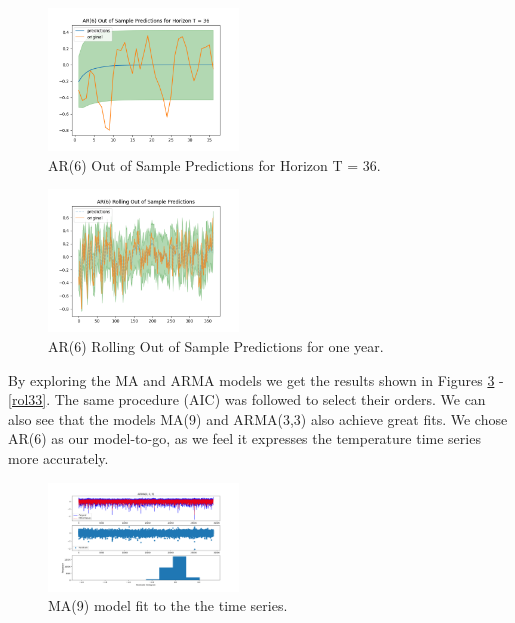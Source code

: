 \documentclass[conference]{IEEEtran}
\begin{document}
\begin{figure}[ht]
    \centering
    \includegraphics[width=0.45\textwidth]{Figures/AR(6) Out of Sample Predictions for Horizon T = 36.png}
    \caption{AR(6) Out of Sample Predictions for Horizon T = 36.}
    \label{hor6}
\end{figure}

\begin{figure}[ht]
    \centering
    \includegraphics[width=0.45\textwidth]{Figures/AR(6) Rolling Out of Sample Predictions.png}
    \caption{AR(6) Rolling Out of Sample Predictions for one year.}
    \label{rol6}
\end{figure}
\vspace{30mm}

By exploring the MA and ARMA models we get the results shown in Figures \ref{ma9} - \ref{rol33}. The same procedure (AIC) was followed to select their orders. We can also see that the models MA(9) and ARMA(3,3) also achieve great fits. We chose AR(6) as our model-to-go, as we feel it expresses the temperature time series more accurately.

\begin{figure}[ht]
    \centering
    \includegraphics[width=0.45\textwidth]{Figures/ARIMA(0,0,9).png}
    \caption{MA(9) model fit to the the time series.}
    \label{ma9}
\end{figure}
\end{document}
